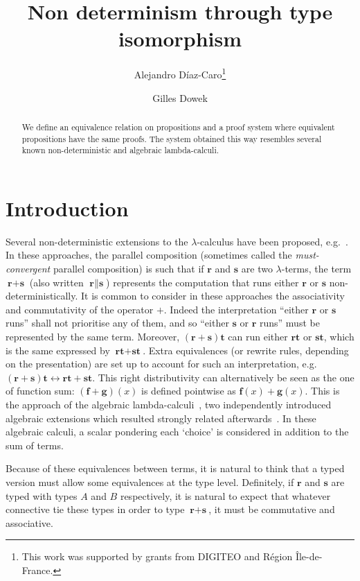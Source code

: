 \documentclass[final,copyright,creativecommons]{eptcs}
\title{Non determinism through type isomorphism}
\author{Alejandro D\'iaz-Caro\thanks{This work was supported by grants from DIGITEO and R\'egion \^Ile-de-France.}
\institute{Universit\'e Paris 13, Sorbonne Paris Cit\'e, LIPN\\
Universit\'e Paris-Ouest Nanterre La D\'efense\\
INRIA}
\and Gilles Dowek
\institute{INRIA\\
23 avenue d'Italie, CS 81321,\\ 75214 Paris Cedex 13}
}
\newcommand{\ve}[1]{\ensuremath{\mathrm{\textbf{#1}}}}
\theoremstyle{definition}
\begin{document}
\maketitle

\begin{abstract}
We define an equivalence relation on propositions and a proof system
where equivalent propositions have the same proofs.  The system
obtained this way resembles several known non-deterministic and
algebraic lambda-calculi.
\end{abstract}

\section{Introduction}
Several non-deterministic extensions to the $\lambda$-calculus have been proposed,
e.g.~\cite{BoudolIC94,BucciarelliEhrhardManzonettoAPAL12,deLiguoroPipernoIC95,DezaniciancaglinideliguoroPipernoTCS96,DezaniciancagliniDeliguoroPipernoSIAM98,PaganiRonchidellaroccaFI10}. In these approaches, the parallel composition (sometimes called the
{\em must-convergent} parallel composition)
is such that if $\ve r$ and $\ve s$ are two $\lambda$-terms, the term $\ve r+\ve s$ (also written $\ve r\parallel\ve s$) represents the computation that runs either $\ve r$ or $\ve s$ non-deterministically.
It is common to consider in these approaches the associativity and commutativity of the operator $+$. Indeed the interpretation ``either $\ve r$ or $\ve s$ runs'' shall not prioritise any of them, and so ``either $\ve s$ or $\ve r$ runs'' must be represented by the same term. Moreover, $(\ve r+\ve s)\ve t$ can run either $\ve r\ve t$ or $\ve s\ve t$, which is the same expressed by $\ve r\ve t+\ve s\ve t$. Extra equivalences (or rewrite rules, depending on the presentation) are set up to account for such an interpretation, e.g.~$(\ve r+\ve s)\ve t\leftrightarrow\ve r\ve t+\ve s\ve t$. This right distributivity can alternatively be seen as the one of function sum: $(\ve f+\ve g)(x)$ is defined pointwise as $\ve f(x)+\ve g(x)$. This is the approach of the algebraic lambda-calculi~\cite{ArrighiDowekRTA08,VauxMSCS09}, two independently introduced algebraic extensions which resulted strongly related afterwards~\cite{AssafPerdrixDCM11,DiazcaroPerdrixTassonValironHOR10}. In these algebraic calculi, a scalar pondering each `choice' is considered in addition to the sum of terms.

Because of these equivalences between terms, it is natural to think that a typed version must allow some equivalences at the type level. Definitely, if $\ve r$ and $\ve s$ are typed with types $A$ and $B$ respectively, it is natural to expect that whatever connective tie these types in order to type $\ve r+\ve s$, it must be commutative and associative.
\end{document}
